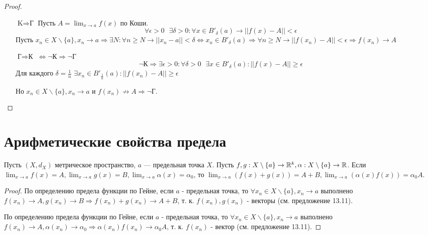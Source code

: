      \begin{proof}
    	$ $
    	
    	\begin{itemize}
    		\item[$\text{K} \Rightarrow \text{Г}$] Пусть $A = \lim_{x \to a} f(x)$ по Коши.
    		\[ \forall \epsilon > 0 \text{ } \exists \delta > 0: \forall x \in B'_{\delta}(a) \rightarrow ||f(x) - A|| < \epsilon \]
    		Пусть $x_n \in X \backslash \{a\}, x_n \to a \Rightarrow \exists N: \forall n \geqslant N \rightarrow ||x_n - a|| < \delta \Leftrightarrow x_n \in B'_{\delta}(a) \Rightarrow \forall n \geqslant N \rightarrow ||f(x_n) - A|| < \epsilon \Rightarrow f(x_n) \rightarrow A$
    		\item[$\text{Г} \Rightarrow \text{К}$] $\Leftrightarrow \neg \text{К} \Rightarrow \neg \text{Г}$
    		\[ \neg\text{К} \Rightarrow \exists \epsilon > 0 : \forall \delta > 0 \text{ } \exists x \in B'_{\delta}(a) : ||f(x) - A|| \geqslant \epsilon \]
    		Для каждого $\delta = \frac{1}{n}$ $\exists x_n \in B'_{\frac{1}{n}}(a) : ||f(x_n) - A|| \geqslant \epsilon$
    		
    		Но $x_n \in X \backslash \{a\}, x_n \to a$ и $f(x_n) \not\to A \Rightarrow \neg \text{Г}$.         
    	\end{itemize}
    \end{proof}
    
    \section{Арифметические свойства предела}
    
    \begin{theorem}
    	Пусть $(X, d_X)$ метрическое пространство, $a$ — предельная
    	точка $X$. Пусть $f, g : X \setminus \{a\} \rightarrow \mathbb R^k,  \alpha : X \setminus \{a\} \rightarrow \mathbb R$. Если $\displaystyle \lim_{x \to a} f(x) = A, \lim_{x \to a} g(x) = B, \lim_{x \to a} \alpha(x) = \alpha_0$, то $\displaystyle \lim_{x \to a} (f(x) + g(x)) = A + B, \lim_{x \to a} (\alpha(x)f(x)) = \alpha_0 A.$
    \end{theorem}
    
    \begin{proof}
    	По определению предела функции по Гейне, если $a$ - предельная точка, то $\forall x_n \in X \backslash \{a\}, x_n \to a$ выполнено $f(x_n) \to A, g(x_n) \to B \Rightarrow f(x_n) + g(x_n) \to A + B$, т. к. $f(x_n), g(x_n)$ - векторы (см. предложение 13.11).
    	
    	По определению предела функции по Гейне, если $a$ - предельная точка, то $\forall x_n \in X \backslash \{a\}, x_n \to a$ выполнено $f(x_n) \to A, \alpha(x_n) \to \alpha_0 \Rightarrow \alpha(x_n) f(x_n) \to \alpha_0 A$, т. к. $f(x_n)$ - вектор (см. предложение 13.11).
    \end{proof}
    
